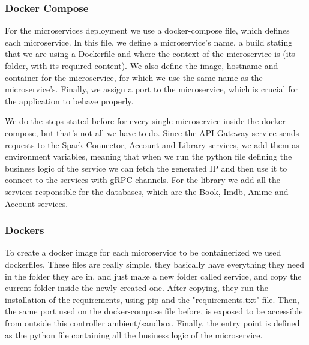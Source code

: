 \documentclass[oneside]{article}
\newcommand*\fpar{\hspace{1ex}}
\begin{document}
    \subsubsection{Docker Compose}
    \fpar For the microservices deployment we use a docker-compose file, which defines each microservice. In this file, we define a microservice's name, a build stating that we are using a Dockerfile and where the context of the microservice is (its folder, with its required content). We also define the image, hostname and container for the microservice, for which we use the same name as the microservice's. Finally, we assign a port to the microservice, which is crucial for the application to behave properly.
    \par We do the steps stated before for every single microservice inside the docker-compose, but that's not all we have to do. Since the API Gateway service sends requests to the Spark Connector, Account and Library services, we add them as environment variables, meaning that when we run the python file defining the business logic of the service we can fetch the generated IP and then use it to connect to the services with gRPC channels. For the library we add all the services responsible for the databases, which are the Book, Imdb, Anime and Account services.

    \subsubsection{Dockers}
    \fpar To create a docker image for each microservice to be containerized we used dockerfiles. These files are really simple, they basically have everything they need in the folder they are in, and just make a new folder called service, and copy the current folder inside the newly created one. After copying, they run the installation of the requirements, using pip and the "requirements.txt" file. Then, the same port used on the docker-compose file before, is exposed to be accessible from outside this controller ambient/sandbox. Finally, the entry point is defined as the python file containing all the business logic of the microservice.
\end{document}
